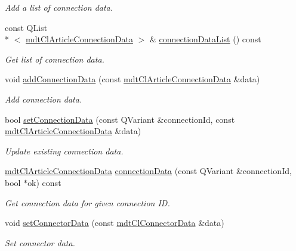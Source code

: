 \begin{DoxyCompactItemize}
\begin{DoxyCompactList}\small\item\em Add a list of connection data. \end{DoxyCompactList}\item 
const Q\-List\\*
$<$ \hyperlink{classmdt_cl_article_connection_data}{mdt\-Cl\-Article\-Connection\-Data} $>$ \& \hyperlink{classmdt_cl_article_connector_data_a8fddc132f88bcdc62a637b40e1d49feb}{connection\-Data\-List} () const 
\begin{DoxyCompactList}\small\item\em Get list of connection data. \end{DoxyCompactList}\item 
void \hyperlink{classmdt_cl_article_connector_data_ab3c156fb10da85e943a5cc4f8d37fd2d}{add\-Connection\-Data} (const \hyperlink{classmdt_cl_article_connection_data}{mdt\-Cl\-Article\-Connection\-Data} \&data)
\begin{DoxyCompactList}\small\item\em Add connection data. \end{DoxyCompactList}\item 
bool \hyperlink{classmdt_cl_article_connector_data_a53336ffc604daecd55f070910beef474}{set\-Connection\-Data} (const Q\-Variant \&connection\-Id, const \hyperlink{classmdt_cl_article_connection_data}{mdt\-Cl\-Article\-Connection\-Data} \&data)
\begin{DoxyCompactList}\small\item\em Update existing connection data. \end{DoxyCompactList}\item 
\hyperlink{classmdt_cl_article_connection_data}{mdt\-Cl\-Article\-Connection\-Data} \hyperlink{classmdt_cl_article_connector_data_a8d773cc831a196e6f41f9436aa0c919d}{connection\-Data} (const Q\-Variant \&connection\-Id, bool $\ast$ok) const 
\begin{DoxyCompactList}\small\item\em Get connection data for given connection I\-D. \end{DoxyCompactList}\item 
void \hyperlink{classmdt_cl_article_connector_data_a5e6c1f12ff83365cb5c54537a06baf30}{set\-Connector\-Data} (const \hyperlink{classmdt_cl_connector_data}{mdt\-Cl\-Connector\-Data} \&data)
\begin{DoxyCompactList}\small\item\em Set connector data. \end{DoxyCompactList}\item 

\end{DoxyCompactItemize}
